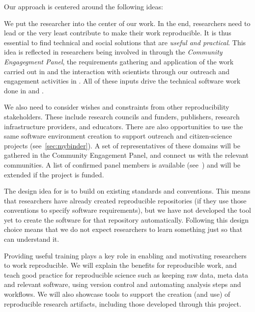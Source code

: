 Our approach is centered around the following ideas:
\begin{compactenum}
  \item We put the researcher into the center of our work. In the end,
    researchers need to lead or the very least contribute to make their work
    reproducible. It is thus essential to find technical and social solutions
    that are \emph{useful and practical}. This idea is reflected in researchers
    being involved in  through the \emph{Community Engagegment
    Panel}, the requirements gathering and application of the work carried out
  in  and the interaction with scientists through our
  outreach and engagement activities in . All of these inputs
  drive the technical software work done in  and .
\item We also need to consider wishes and constraints from other reproducibility
  stakeholders. These include research councils and funders, publishers, research
  infrastructure providers, and educators. There are also opportunities to use the same
  software environment creation to support outreach and
  citizen-science projects (see~\ref{sec:mybinder}). A set of representatives of
  these domains will be gathered in the Community Engagement Panel, and connect
  us with the relevant communities. A list of confirmed panel members is
  available (see~) and will be
  extended if the project is funded.
\item The design idea for \repotodocker{} is to build on existing standards and
  conventions. This means that researchers have already created reproducible
  repositories (if they use those conventions to specify software requirements),
  but we have not developed the tool yet to create the software for that
  repository automatically. Following this design choice means that we do not
  expect researchers to learn something just so that \repotodocker{} can
  understand it.
\item Providing useful training plays a key role in enabling and motivating
  researchers to work reproducible. We will explain the benefits for
  reproducible work, and teach good practice for reproducible science such as
  keeping raw data,  meta data and relevant software, using version control and
  automating analysis steps and workflows.
  We will also showcase tools to support the creation (and use) of reproducible
  research artifacts, including those developed through this project.

\end{compactenum}
